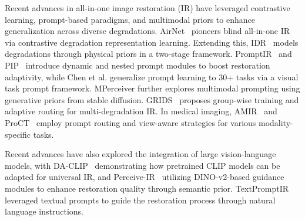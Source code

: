 \documentclass[lettersize,journal]{IEEEtran}
\begin{document}
Recent advances in all-in-one image restoration (IR) have leveraged contrastive learning, prompt-based paradigms, and multimodal priors to enhance generalization across diverse degradations. AirNet~\cite{allinone_li2022all} pioneers blind all-in-one IR via contrastive degradation representation learning. Extending this, IDR~\cite{zhang2023ingredient} models degradations through physical priors in a two-stage framework. PromptIR~\cite{allinone_potlapalli2024promptir} and PIP~\cite{li2023prompt} introduce dynamic and nested prompt modules to boost restoration adaptivity, while Chen et al.\cite{allinone_chen2024learning} generalize prompt learning to 30+ tasks via a visual task prompt framework. MPerceiver\cite{ai2024multimodal} further explores multimodal prompting using generative priors from stable diffusion. GRIDS~\cite{allinone_cao2025grids} proposes group-wise training and adaptive routing for multi-degradation IR. In medical imaging, AMIR~\cite{yang2024all} and ProCT~\cite{ma2023prompted} employ prompt routing and view-aware strategies for various modality-specific tasks.



Recent advances have also explored the integration of large vision-language models, with DA-CLIP~\cite{luo2023controlling} demonstrating how pretrained CLIP models can be adapted for universal IR, and Perceive-IR~\cite{zhang2025perceive} utilizing DINO-v2-based guidance modules to enhance restoration quality through semantic prior.
TextPromptIR~\cite{yan2025textual} leveraged textual prompts to guide the restoration process through natural language instructions.
\end{document}
